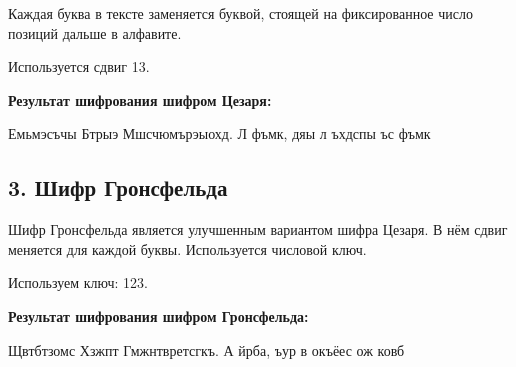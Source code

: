 \documentclass[a4paper,12pt]{article}
\begin{document}
Каждая буква в тексте заменяется буквой, стоящей на фиксированное
число позиций дальше в алфавите.

Используется сдвиг 13.

\textbf{Результат шифрования шифром Цезаря:}

\begin{center}
  Емьмэсъчы Бтрыэ Мшсчюмърэыохд. Л фъмк, дяы л ъхдспы ъс фъмк
\end{center}

\subsection*{3. Шифр Гронсфельда}

Шифр Гронсфельда является улучшенным вариантом шифра Цезаря. В нём
сдвиг меняется для каждой буквы. Используется числовой ключ.

Используем ключ: 123.

\textbf{Результат шифрования шифром Гронсфельда:}

\begin{center}
  Щвтбтзомс Хзжпт Гмжнтвретсгкъ. А йрба, ъур в окъёес ож ковб
\end{center}
\end{document}
